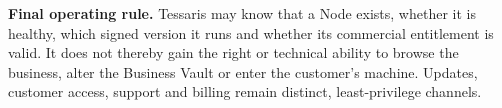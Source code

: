\documentclass[11pt]{article}
\begin{document}
\vfill
\noindent\colorbox{TessarisGreenPale}{\parbox{0.96\linewidth}{
\textbf{Final operating rule.} Tessaris may know that a Node exists, whether it is healthy, which signed version it runs and whether its commercial entitlement is valid. It does not thereby gain the right or technical ability to browse the business, alter the Business Vault or enter the customer's machine. Updates, customer access, support and billing remain distinct, least-privilege channels.
}}
\end{document}
